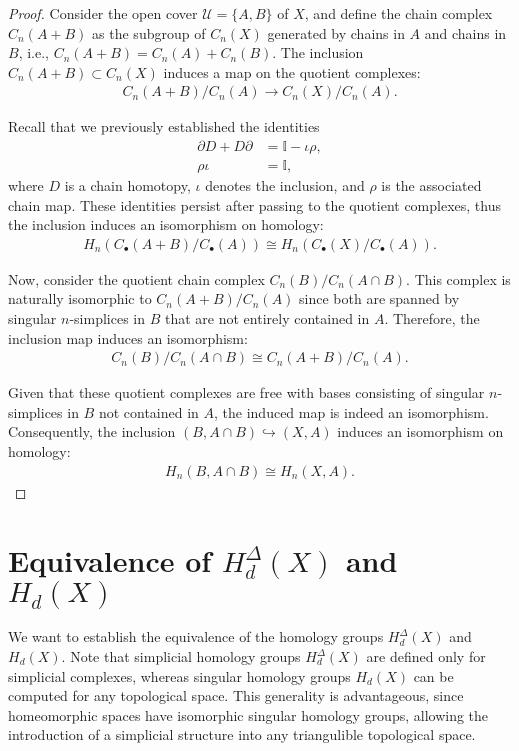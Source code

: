 \begin{proof}
	Consider the open cover \( \mathcal{U} = \{A, B\} \) of \( X \), and define the chain complex \( C_n(A + B) \) as the subgroup of \( C_n(X) \) generated by chains in \( A \) and chains in \( B \), i.e., \( C_n(A + B) = C_n(A) + C_n(B) \). The inclusion \( C_n(A + B) \subset C_n(X) \) induces a map on the quotient complexes:
	\begin{align}
		C_n(A + B)/C_n(A) \to C_n(X)/C_n(A). 
	\end{align}
		
	Recall that we previously established the identities
	\begin{align}
		\partial D + D\partial & = \mathbb{I} - \iota\rho, \\
		\rho\iota              & = \mathbb{I},             
	\end{align}
	where \( D \) is a chain homotopy, \( \iota \) denotes the inclusion, and \( \rho \) is the associated chain map. These identities persist after passing to the quotient complexes, thus the inclusion induces an isomorphism on homology:
	\begin{align}
		H_n(C_\bullet(A + B)/C_\bullet(A)) \cong H_n(C_\bullet(X)/C_\bullet(A)). 
	\end{align}
		
	Now, consider the quotient chain complex \( C_n(B)/C_n(A \cap B) \). This complex is naturally isomorphic to \( C_n(A + B)/C_n(A) \) since both are spanned by singular \( n \)-simplices in \( B \) that are not entirely contained in \( A \). Therefore, the inclusion map induces an isomorphism:
	\begin{align}
		C_n(B)/C_n(A \cap B) \cong C_n(A + B)/C_n(A). 
	\end{align}
		
	Given that these quotient complexes are free with bases consisting of singular \( n \)-simplices in \( B \) not contained in \( A \), the induced map is indeed an isomorphism. Consequently, the inclusion \( (B, A \cap B) \hookrightarrow (X, A) \) induces an isomorphism on homology:
	\begin{align}
		H_n(B, A \cap B) \cong H_n(X, A). 
	\end{align}
\end{proof}

\section{Equivalence of $H_{d}^{\Delta}(X)$ and $H_{d}(X)$}
\label{HomologicalEquivalence}
We want to establish the equivalence of the homology groups $H^{\Delta}_{d}(X)$ and $H_{d}(X)$. Note that simplicial homology groups $H^{\Delta}_{d}(X)$ are defined only for simplicial complexes, whereas singular homology groups $H_{d}(X)$ can be computed for any topological space. This generality is advantageous, since homeomorphic spaces have isomorphic singular homology groups, allowing the introduction of a simplicial structure into any triangulible topological space.

